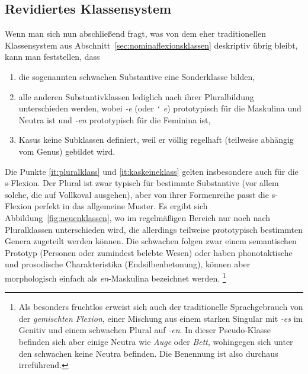 \subsection{Revidiertes Klassensystem}

\label{sec:neuenklassen}


Wenn man sich nun abschließend fragt, was von dem eher traditionellen Klassensystem aus Abschnitt~\ref{sec:nominaflexionsklassen} deskriptiv übrig bleibt, kann man feststellen, dass

\begin{enumerate}\Lf
  \item die sogenannten schwachen Substantive eine Sonderklasse bilden,
  \item\label{it:pluralklass} alle anderen Substantivklassen lediglich nach ihrer Pluralbildung unterschieden werden, wobei \textit{-e} (oder \textit{\char`~e}) prototypisch für die Maskulina und Neutra ist und \textit{-en} prototypisch für die Feminina ist,
  \item\label{it:kaskeineklass} Kasus keine Subklassen definiert, weil er völlig regelhaft (teilweise abhängig vom Genus) gebildet wird.
\end{enumerate}

Die Punkte \ref{it:pluralklass} und \ref{it:kaskeineklass} gelten insbesondere auch für die s-Flexion.
Der Plural ist zwar typisch für bestimmte Substantive (vor allem solche, die auf Vollkoval ausgehen), aber von ihrer Formenreihe passt die s-Flexion perfekt in das allgemeine Muster.
Es ergibt sich Abbildung~\ref{fig:neuenklassen}, wo im regelmäßigen Bereich nur noch nach Pluralklassen unterschieden wird, die allerdings teilweise prototypisch bestimmten Genera zugeteilt werden können.
Die schwachen folgen zwar einem semantischen Prototyp (Personen oder zumindest belebte Wesen) oder haben phonotaktische und prosodische Charakteristika (\zB Endsilbenbetonung), können aber morphologisch einfach als \textit{en}-Maskulina bezeichnet werden.%
\footnote{Als besonders fruchtlos erweist sich auch der traditionelle Sprachgebrauch von der \textit{gemischten Flexion}, einer Mischung aus einem starken Singular mit \textit{-es} im Genitiv und einem schwachen Plural auf \textit{-en}.
In dieser Pseudo-Klasse befinden sich aber einige Neutra wie \textit{Auge} oder \textit{Bett}, wohingegen sich unter den schwachen keine Neutra befinden.
Die Benennung ist also durchaus irreführend.}

